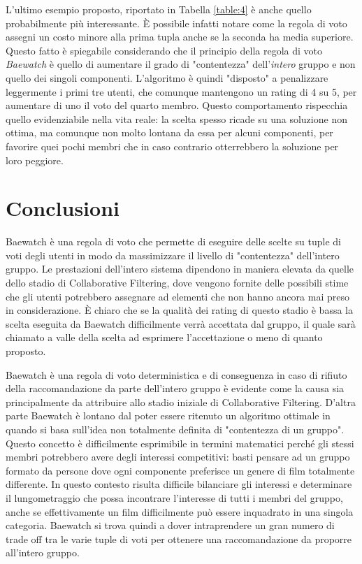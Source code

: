 \documentclass[letterpaper]{article}
\begin{document}
L'ultimo esempio proposto, riportato in Tabella \ref{table:4} è anche quello probabilmente più interessante. \`E possibile infatti notare come la regola di voto assegni un costo minore alla prima tupla anche se la seconda ha media superiore. Questo fatto è spiegabile considerando che il principio della regola di voto \emph{Baewatch} è quello di aumentare il grado di "contentezza" dell'\emph{intero} gruppo e non quello dei singoli componenti. L'algoritmo è quindi "disposto" a penalizzare leggermente i primi tre utenti, che comunque mantengono un rating di 4 su 5, per aumentare di uno il voto del quarto membro. Questo comportamento rispecchia quello evidenziabile nella vita reale: la scelta spesso ricade su una soluzione non ottima, ma comunque non molto lontana da essa per alcuni componenti, per favorire quei pochi membri che in caso contrario otterrebbero la soluzione per loro peggiore.

\section{Conclusioni}
Baewatch è una regola di voto che permette di eseguire delle scelte su tuple di voti degli utenti in modo da massimizzare il livello di "contentezza" dell'intero gruppo. Le prestazioni dell'intero sistema dipendono in maniera elevata da quelle dello stadio di Collaborative Filtering, dove vengono fornite delle possibili stime che gli utenti potrebbero assegnare ad elementi che non hanno ancora mai preso in considerazione. \`E chiaro che se la qualità dei rating di questo stadio è bassa la scelta eseguita da Baewatch difficilmente verrà accettata dal gruppo, il quale sarà chiamato a valle della scelta ad esprimere l'accettazione o meno di quanto proposto.

Baewatch è una regola di voto deterministica e di conseguenza in caso di rifiuto della raccomandazione da parte dell'intero gruppo è evidente come la causa sia principalmente da attribuire allo stadio iniziale di Collaborative Filtering. D'altra parte Baewatch è lontano dal poter essere ritenuto un algoritmo ottimale in quando si basa sull'idea non totalmente definita di "contentezza di un gruppo". Questo concetto è difficilmente esprimibile in termini matematici perché gli stessi membri potrebbero avere degli interessi competitivi: basti pensare ad un gruppo formato da persone dove ogni componente preferisce un genere di film totalmente differente. In questo contesto risulta difficile bilanciare gli interessi e determinare il lungometraggio che possa incontrare l'interesse di tutti i membri del gruppo, anche se effettivamente un film difficilmente può essere inquadrato in una singola categoria. Baewatch si trova quindi a dover intraprendere un gran numero di trade off tra le varie tuple di voti per ottenere una raccomandazione da proporre all'intero gruppo.
\end{document}
